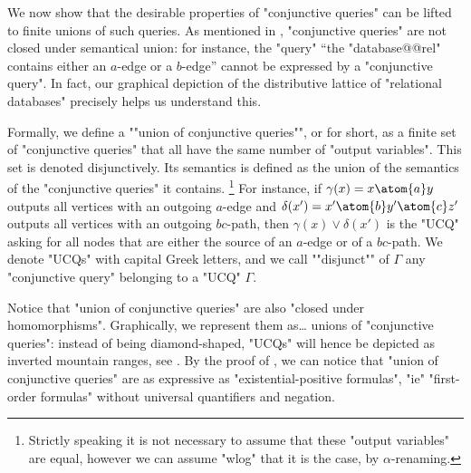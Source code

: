 We now show that the desirable properties of "conjunctive queries" can be
lifted to finite unions of such queries.
As mentioned in , "conjunctive queries"
are not closed under semantical union: for instance,
the "query" ``the "database@@rel" contains either an $a$-edge or a $b$-edge''
cannot be expressed by a "conjunctive query".
In fact, our graphical depiction of the distributive lattice of "relational databases"
precisely helps us understand this.

Formally, we define a ""union of conjunctive queries"", or  for short,
as a finite set of "conjunctive queries" that all have the same number
of "output variables". This set is denoted disjunctively.
Its semantics is defined as the union of the semantics of the "conjunctive queries" it
contains.
\footnote[][2em]{Strictly speaking it is not necessary
to assume that these "output variables" are equal, however we can assume "wlog" that
it is the case, by $\alpha$-renaming.}
For instance, if $\gamma(x) = x \atom{a} y$ outputs all vertices
with an outgoing $a$-edge and $\delta(x') = x' \atom{b} y' \atom{c} z'$
outputs all vertices with an outgoing $bc$-path, then
$\gamma(x) \lor \delta(x')$ is the "UCQ" asking for all nodes
that are either the source of an $a$-edge or of a $bc$-path.
We denote "UCQs" with capital Greek letters,
and \AP we call ""disjunct"" of $\Gamma$ any "conjunctive query" belonging to a
"UCQ" $\Gamma$.

Notice that "union of conjunctive queries" are also "closed under homomorphisms".
Graphically, we represent them as… unions of "conjunctive queries":
instead of being diamond-shaped, "UCQs" will hence be depicted
as inverted mountain ranges, see .
By the proof of , we can notice that "union of conjunctive queries"
are as expressive as "existential-positive formulas", "ie" "first-order formulas"
without universal quantifiers and negation.

